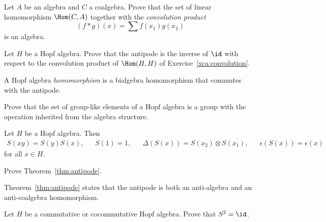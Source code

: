 \begin{exercise}
    \label{xca:convolution}
    Let $A$ be an algebra and $C$ a coalgebra. 
    Prove that the set 
    of linear homomorphism $\Hom(C,A)$ together with
    the \emph{convolution product}
    \[
    (f*g)(x) = \sum f(x_1)g(x_2)
    \]
    is an algebra. 
\end{exercise}

\begin{exercise}
    \label{xca:antipode}
    Let $H$ be a Hopf algebra. Prove that
    the antipode is the inverse of 
    $\id$ with respect to the convolution 
    product of $\Hom(H,H)$ of Exercise~\ref{xca:convolution}.
\end{exercise}

\begin{definition}
A Hopf algebra \emph{homomorphism} 
is a bialgebra homomorphism that commutes with the antipode. 
\end{definition}

\begin{exercise}
  Prove that the set of group-like elements of a Hopf algebra is a group with
  the operation inherited from the algebra structure. 
\end{exercise}


\begin{theorem}
\label{thm:antipode}
    Let $H$ be a Hopf algebra. Then
    \begin{align*}
        S(xy)=S(y)S(x), && S(1)=1, &&
        \Delta(S(x))=S(x_{2})\otimes S(x_{1}),
        && \epsilon(S(x))=\epsilon(x)
    \end{align*}
    for all $x\in H$. 
\end{theorem}

\begin{exercise}
    Prove Theorem~\ref{thm:antipode}.
\end{exercise}

Theorem~\ref{thm:antipode} states that the antipode is both an anti-algebra and
an anti-coalgebra homomorphism.

\begin{exercise}
    Let $H$ be a commutative or cocommutative Hopf algebra. 
    Prove that $S^2=\id$. 
\end{exercise}




